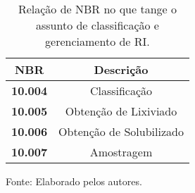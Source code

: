 \begin{table}[htbp]
  \centering
  \caption{Relação de NBR no que tange o assunto de classificação e gerenciamento de RI.}
    \begin{tabular}{|c|c|}
    \toprule
    \rowcolor[rgb]{ .969,  .588,  .275} \textbf{NBR} & \textbf{Descrição} \\
    \midrule
    \rowcolor[rgb]{ .984,  .894,  .835} \textbf{10.004} & Classificação \\
    \midrule
    \textbf{10.005} & Obtenção de Lixiviado \\
    \midrule
    \rowcolor[rgb]{ .984,  .894,  .835} \textbf{10.006} & Obtenção de Solubilizado \\
    \midrule
    \textbf{10.007} & Amostragem \\
    \bottomrule
    \end{tabular}%
  \label{tab:relacao_nbr}%
\end{table}%
Fonte: Elaborado pelos autores.

